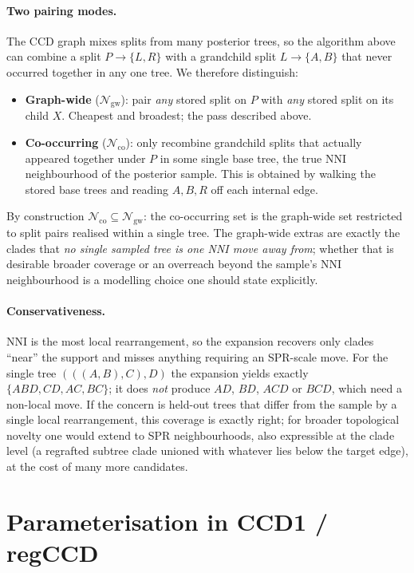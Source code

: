 \documentclass{article}
\newcommand{\NN}{\mathcal{N}}
\begin{document}
\paragraph{Two pairing modes.}
The CCD graph mixes splits from many posterior trees, so the algorithm above can
combine a split $P\to\{L,R\}$ with a grandchild split $L\to\{A,B\}$ that never
occurred together in any one tree. We therefore distinguish:
\begin{itemize}
  \item \textbf{Graph-wide} ($\NN_{\mathrm{gw}}$): pair \emph{any} stored split on
    $P$ with \emph{any} stored split on its child $X$. Cheapest and broadest; the
    pass described above.
  \item \textbf{Co-occurring} ($\NN_{\mathrm{co}}$): only recombine grandchild
    splits that actually appeared together under $P$ in some single base tree,
    the true NNI neighbourhood of the posterior sample. This is obtained by
    walking the stored base trees and reading $A,B,R$ off each internal edge.
\end{itemize}
By construction $\NN_{\mathrm{co}}\subseteq\NN_{\mathrm{gw}}$: the co-occurring
set is the graph-wide set restricted to split pairs realised within a single
tree. The graph-wide extras are exactly the clades that \emph{no single sampled
tree is one NNI move away from}; whether that is desirable broader coverage or an
overreach beyond the sample's NNI neighbourhood is a modelling choice one should
state explicitly.

\paragraph{Conservativeness.}
NNI is the most local rearrangement, so the expansion recovers only clades
``near'' the support and misses anything requiring an SPR-scale move. For the
single tree $(((A,B),C),D)$ the expansion yields exactly $\{ABD, CD, AC, BC\}$;
it does \emph{not} produce $AD$, $BD$, $ACD$ or $BCD$, which need a non-local
move. If the concern is held-out trees that differ from the sample by a single
local rearrangement, this coverage is exactly right; for broader topological
novelty one would extend to SPR neighbourhoods, also expressible at the clade
level (a regrafted subtree clade unioned with whatever lies below the target
edge), at the cost of many more candidates.

\section*{Parameterisation in CCD1 / regCCD}
\end{document}

